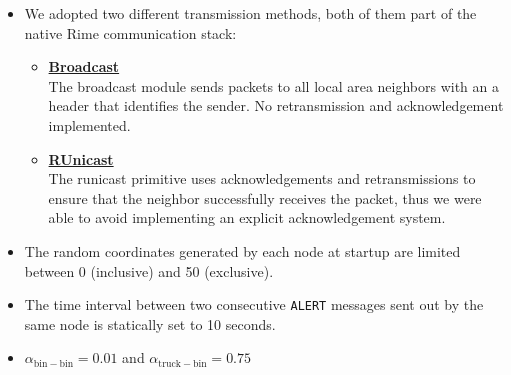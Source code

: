 \documentclass[a4paper, 11pt, parskip=half]{scrartcl}
\begin{document}
\begin{itemize}
	\item We adopted two different transmission methods, both of them part of the native Rime communication stack:
		\begin{itemize}
			\item \href{http://contiki.sourceforge.net/docs/2.6/a01720.html}{\textbf{Broadcast}}
			\\
			The broadcast module sends packets to all local area neighbors with an a header that identifies the sender. No retransmission and acknowledgement implemented.
			\item \href{http://contiki.sourceforge.net/docs/2.6/a01738.html}{\textbf{RUnicast}} %
		    \\
		    The runicast primitive uses acknowledgements and retransmissions to ensure that the neighbor successfully receives the packet, thus we were able to avoid implementing an explicit acknowledgement system.
		\end{itemize}
	\item The random coordinates generated by each node at startup are limited between 0 (inclusive) and 50 (exclusive).
	\item The time interval between two consecutive \texttt{ALERT} messages sent out by the same node is statically set to 10 seconds.
	\item $\alpha_\mathrm{bin-bin} = 0.01$ and $\alpha_\mathrm{truck-bin} = 0.75$
\end{itemize}
\end{document}
